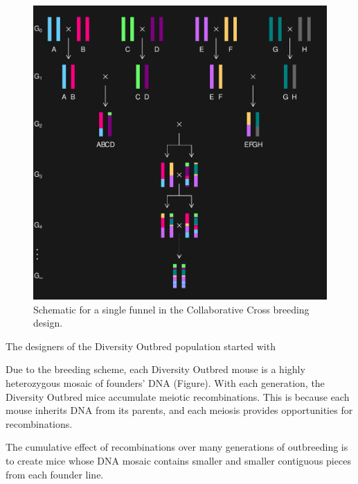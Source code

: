 \documentclass[oneside]{book}\usepackage[]{graphicx}\usepackage[]{color}
\makeatletter
\def\maxwidth{ %
  \ifdim\Gin@nat@width>\linewidth
    \linewidth
  \else
    \Gin@nat@width
  \fi
}
\newenvironment{knitrout}{}{} %
\makeatother
\begin{document}
\begin{knitrout}
\color{fgcolor}\begin{figure}
\includegraphics[width=\maxwidth]{figure/ri8-1} \caption[Schematic for a single funnel in the Collaborative Cross breeding design]{Schematic for a single funnel in the Collaborative Cross breeding design.}\label{fig:ri8}
\end{figure}


\end{knitrout}




The designers of the Diversity Outbred population started with 

Due to the breeding scheme, each Diversity Outbred mouse is a highly heterozygous mosaic of 
founders' DNA (Figure). 
With each generation, the Diversity Outbred mice accumulate meiotic recombinations. 
This is because each mouse inherits DNA from its parents, and each meiosis provides opportunities for recombinations. 

The cumulative effect of recombinations over many generations of outbreeding is to create mice whose DNA mosaic contains smaller and smaller contiguous pieces from each founder line. 
\end{document}
